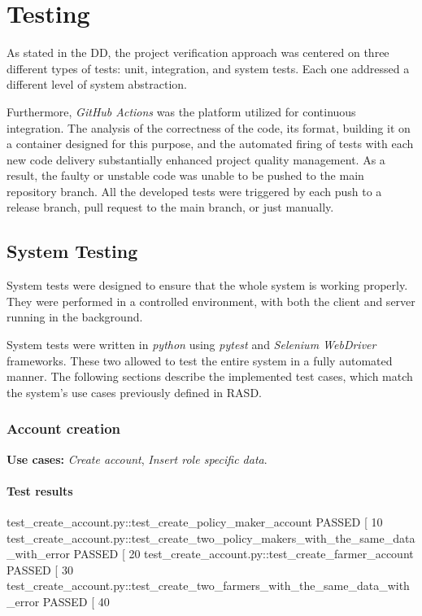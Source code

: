 \chapter{Testing} \label{ch:testing}

As stated in the DD, the project verification approach was centered on three different types of tests: unit, integration, and system tests. Each one addressed a different level of system abstraction.

Furthermore, \textit{GitHub Actions} was the platform utilized for continuous integration. The analysis of the correctness of the code, its format, building it on a container designed for this purpose, and the automated firing of tests with each new code delivery substantially enhanced project quality management. As a result, the faulty or unstable code was unable to be pushed to the main repository branch. All the developed tests were triggered by each push to a release branch, pull request to the main branch, or just manually.

\section{System Testing}

System tests were designed to ensure that the whole system is working properly. They were performed in a controlled environment, with both the client and server running in the background.

System tests were written in \textit{python} using \textit{pytest} \cite{pytest} and \textit{Selenium WebDriver} \cite{selenium} frameworks. These two allowed to test the entire system in a fully automated manner. The following sections describe the implemented test cases, which match the system's use cases previously defined in RASD.

\subsection{Account creation}

\textbf{Use cases:} \textit{Create account}, \textit{Insert role specific data}.

\subsubsection*{Test results}
\begin{verbnobox}[\tiny]
    test_create_account.py::test_create_policy_maker_account PASSED          [ 10%
    test_create_account.py::test_create_two_policy_makers_with_the_same_data_with_error PASSED [ 20%
    test_create_account.py::test_create_farmer_account PASSED                [ 30%
    test_create_account.py::test_create_two_farmers_with_the_same_data_with_error PASSED [ 40%
\end{verbnobox}

